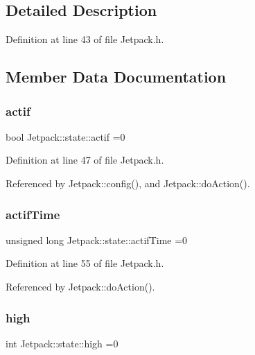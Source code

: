 \subsection{Detailed Description}


Definition at line 43 of file Jetpack.\+h.



\subsection{Member Data Documentation}
\mbox{\label{structJetpack_1_1state_aa177541689bbaea21a4650a083b0df77}} 
\subsubsection{\texorpdfstring{actif}{actif}}
{\footnotesize\ttfamily bool Jetpack\+::state\+::actif =0}



Definition at line 47 of file Jetpack.\+h.



Referenced by Jetpack\+::config(), and Jetpack\+::do\+Action().

\mbox{\label{structJetpack_1_1state_af2e1cc323ef9ffcc3cf4d203f85d726b}} 
\subsubsection{\texorpdfstring{actif\+Time}{actifTime}}
{\footnotesize\ttfamily unsigned long Jetpack\+::state\+::actif\+Time =0}



Definition at line 55 of file Jetpack.\+h.



Referenced by Jetpack\+::do\+Action().

\mbox{\label{structJetpack_1_1state_a54cc9291c7cc30102a07fd2b0ccd8dde}} 
\subsubsection{\texorpdfstring{high}{high}}
{\footnotesize\ttfamily int Jetpack\+::state\+::high =0}



